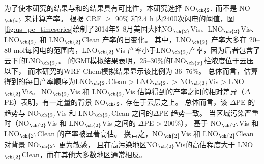 为了使本研究的结果与\citet{Pickering.2016}和\citet{Lapierre.2020}的结果具有可比性，本研究选择 NO$_{\ch{2}}$  而不是 NO$_{\ch{x}}$  来计算产率。
根据 CRF $\geq$ 90\% 和2.4 h 内2400次闪电的阈值，图\ref{fig:us_pe_timeseries}绘制了2014年5--8月美国大陆NO$_{\ch{2}}$Vis、LNO$_{\ch{2}}$Vis、LNO$_{\ch{2}}$ 和 LNO$_{\ch{2}}$Clean 产率的日变化。
其中，LNO$_{\ch{2}}$ 产率大多在 20--80 mol每闪电的范围内，LNO$_{\ch{2}}$Vis 产率小于LNO$_{\ch{2}}$产率，因为后者包含了云下的LNO$_{\ch{2}}$。
\citet{Pickering.2016}的GMI模拟结果表明，25--30\%的LNO$_{\ch{x}}$柱浓度位于云压以下，
而本研究的WRF-Chem模拟结果显示该比例为 36--76\%。
总体而言，估算得到的每日产率顺序为LNO$_{\ch{2}}$Clean > LNO$_{\ch{2}}$ > NO$_{\ch{2}}$Vis > LNO$_{\ch{2}}$Vis。
NO$_{\ch{2}}$Vis 和 LNO$_{\ch{2}}$Vis 估算得到的产率之间的相对差异（$\Delta$PE）表明，有一定量的背景 NO$_{\ch{2}}$ 存在于云层之上。
总体而言，该 $\Delta$PE 的趋势与 NO$_{\ch{2}}$Vis 和 LNO$_{\ch{2}}$Clean 之间的$\Delta$PE 趋势一致。
当区域污染严重时（NO$_{\ch{2}}$Vis 和 LNO$_{\ch{2}}$Vis 之间的 $\Delta$PE > 200\%），
基于 NO$_{\ch{2}}$Vis 和 LNO$_{\ch{2}}$Clean 的产率被显著高估。
换言之，NO$_{\ch{2}}$Vis 和 LNO$_{\ch{2}}$Clean 对背景 NO$_{\ch{2}}$ 更为敏感，
且在高污染地区NO$_{\ch{2}}$Vis的高估程度大于 LNO$_{\ch{2}}$Clean，而在其他大多数地区通常相反。



